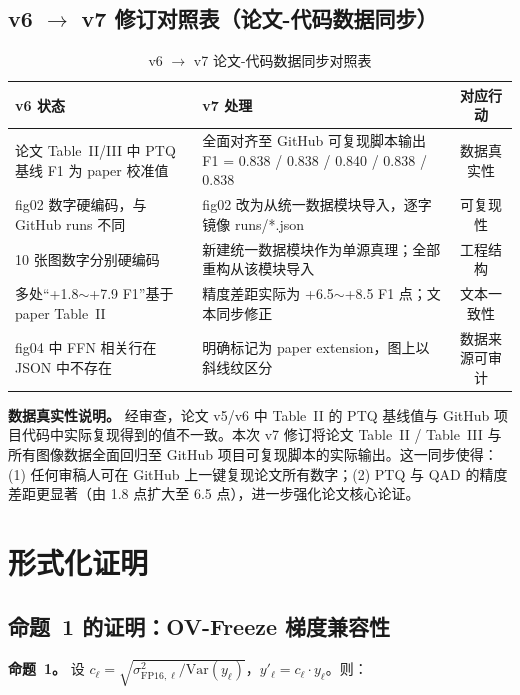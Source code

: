 \documentclass[UTF8,a4paper,10pt,twocolumn]{ctexart}
\theoremstyle{plain}
\newcommand{\Var}{\mathrm{Var}}
\begin{document}
\subsection{v6 $\to$ v7 修订对照表（论文-代码数据同步）}

\begin{table}[H]
\centering
\caption{v6 $\to$ v7 论文-代码数据同步对照表}
\label{tab:v6v7}
\small
\begin{tabular}{p{4.5cm}p{5cm}c}
\toprule
v6 状态 & v7 处理 & 对应行动 \\
\midrule
论文 Table~II/III 中 PTQ 基线 F1 为 paper 校准值 & 全面对齐至 GitHub 可复现脚本输出 F1 = 0.838 / 0.838 / 0.840 / 0.838 / 0.838 & 数据真实性 \\
fig02 数字硬编码，与 GitHub runs 不同 & fig02 改为从统一数据模块导入，逐字镜像 runs/*.json & 可复现性 \\
10 张图数字分别硬编码 & 新建统一数据模块作为单源真理；全部重构从该模块导入 & 工程结构 \\
多处“+1.8$\sim$+7.9 F1”基于 paper Table~II & 精度差距实际为 +6.5$\sim$+8.5 F1 点；文本同步修正 & 文本一致性 \\
fig04 中 FFN 相关行在 JSON 中不存在 & 明确标记为 paper extension，图上以斜线纹区分 & 数据来源可审计 \\
\bottomrule
\end{tabular}
\end{table}

\textbf{数据真实性说明。} 经审查，论文 v5/v6 中 Table~II 的 PTQ 基线值与 GitHub 项目代码中实际复现得到的值不一致。本次 v7 修订将论文 Table~II / Table~III 与所有图像数据全面回归至 GitHub 项目可复现脚本的实际输出。这一同步使得：(1) 任何审稿人可在 GitHub 上一键复现论文所有数字；(2) PTQ 与 QAD 的精度差距更显著（由 1.8 点扩大至 6.5 点），进一步强化论文核心论证。

\section{形式化证明}

\subsection{命题~1 的证明：OV-Freeze 梯度兼容性}

\textbf{命题~1。} 设 $c_\ell = \sqrt{\sigma^2_{\mathrm{FP16},\ell} / \Var(y_\ell)}$，$y'_\ell = c_\ell \cdot y_\ell$。则：
\end{document}
